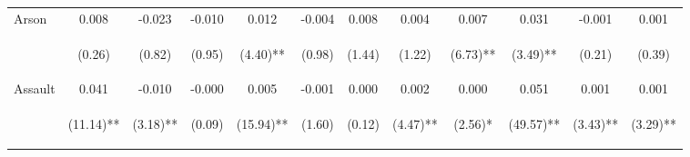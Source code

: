 \begin{tabular}{lccccccccccc}
\noalign{\smallskip}Arson & 0.008 & -0.023 & -0.010 & 0.012 & -0.004 & 0.008 & 0.004 & 0.007 & 0.031 & -0.001 & 0.001\\
 & \begin{footnotesize}(0.26)\end{footnotesize} & \begin{footnotesize}(0.82)\end{footnotesize} & \begin{footnotesize}(0.95)\end{footnotesize} & \begin{footnotesize}(4.40)**\end{footnotesize} & \begin{footnotesize}(0.98)\end{footnotesize} & \begin{footnotesize}(1.44)\end{footnotesize} & \begin{footnotesize}(1.22)\end{footnotesize} & \begin{footnotesize}(6.73)**\end{footnotesize} & \begin{footnotesize}(3.49)**\end{footnotesize} & \begin{footnotesize}(0.21)\end{footnotesize} & \begin{footnotesize}(0.39)\end{footnotesize}\\
\noalign{\smallskip}Assault & 0.041 & -0.010 & -0.000 & 0.005 & -0.001 & 0.000 & 0.002 & 0.000 & 0.051 & 0.001 & 0.001\\
 & \begin{footnotesize}(11.14)**\end{footnotesize} & \begin{footnotesize}(3.18)**\end{footnotesize} & \begin{footnotesize}(0.09)\end{footnotesize} & \begin{footnotesize}(15.94)**\end{footnotesize} & \begin{footnotesize}(1.60)\end{footnotesize} & \begin{footnotesize}(0.12)\end{footnotesize} & \begin{footnotesize}(4.47)**\end{footnotesize} & \begin{footnotesize}(2.56)*\end{footnotesize} & \begin{footnotesize}(49.57)**\end{footnotesize} & \begin{footnotesize}(3.43)**\end{footnotesize} & \begin{footnotesize}(3.29)**\end{footnotesize}\\

\end{tabular}

